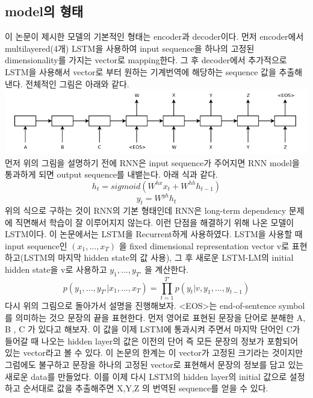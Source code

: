 \documentclass[extendedabs]{bmvc2k}
\begin{document}
 \subsection{model의 형태\cite{youtube_seq}}
 \quad 이 논문이 제시한 모델의 기본적인 형태는 encoder과 decoder이다. 먼저 encoder에서 multilayered(4개) LSTM을 사용하여 input sequence을 하나의 고정된 dimensionality를 가지는 vector로 mapping한다.
 그 후 decoder에서 추가적으로 LSTM을 사용해서 vector로 부터 원하는 기계번역에 해당하는 sequence 값을 추출해낸다. 전체적인 그림은 아래와 같다.
 \newline  \includegraphics[width=\linewidth]{images/00_seq2seq.PNG}
 먼저 위의 그림을 설명하기 전에 RNN은 input sequence가 주어지면 RNN model을 통과하게 되면 output sequence를 내뱉는다. 아래 식과 같다. 
 $$ h_t = sigmoid(W^{hx}x_t + W^{hh}h_{t-1}) $$
 $$ y_t = W^{yh}h_t $$
 위의 식으로 구하는 것이 RNN의 기본 형태인데 RNN은 long-term dependency 문제에 직면해서 학습이 잘 이루어지지 않는다. 
 이런 단점을 해결하기 위해 나온 모델이 LSTM이다. 이 논문에서는 LSTM을 Recurrent하게 사용하였다. LSTM을 사용할 때 input sequence인 $(x_1, ... , x_T)$ 을 
 fixed dimensional representation vector v로 표현하고(LSTM의 마지막 hidden state의 값 사용), 그 후 새로운 LSTM-LM의 initial hidden state을 v로 사용하고 
 $y_1, ... , y_{T'}$ 을 계산한다.
 $$ p(y_1, ... , y_{T'} | x_1, ... , x_T) = \prod_{t=1}^{T'}p(y_t | v, y_1 , ... , y_{t-1}) $$
 다시 위의 그림으로 돌아가서 설명을 진행해보자. <EOS>는 end-of-sentence symbol를 의미하는 것으 문장의 끝을 표현한다.
 먼저 영어로 표현된 문장을 단어로 분해한 A, B , C 가 있다고 해보자. 이 값을 이제 LSTM에 통과시켜 주면서 마지막 단어인 C가 들어갈 때 나오는 hidden layer의 값은 
 이전의 단어 즉 모든 문장의 정보가 포함되어 있는 vector라고 볼 수 있다. 이 논문의 한계는 이 vector가 고정된 크기라는 것이지만 그럼에도 불구하고 문장을 하나의 고정된 
 vector로 표현해서 문장의 정보를 담고 있는 새로운 data를 만들었다. 이를 이제 다시 LSTM의 hidden layer의 initial 값으로 설정하고 순서대로 값을 추출해주면 X,Y,Z 의 번역된
 sequence를 얻을 수 있다.
\end{document}
